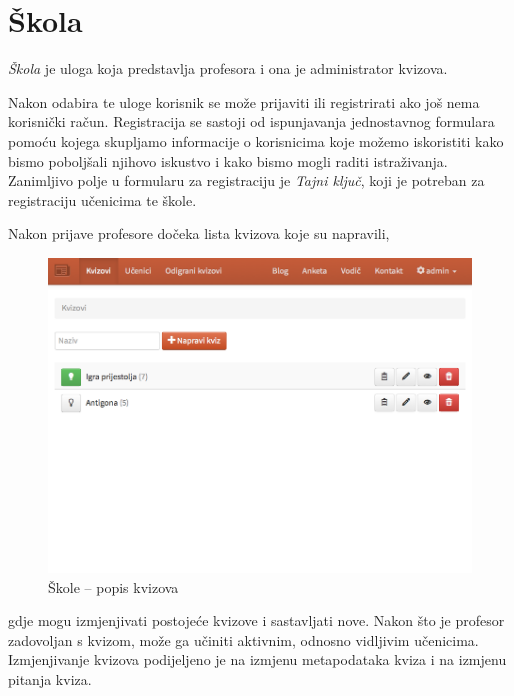 \documentclass{scrreprt}
\begin{document}
\section{Škola}

\emph{Škola} je uloga koja predstavlja profesora i ona je administrator kvizova.

Nakon odabira te uloge korisnik se može prijaviti ili registrirati ako još nema
korisnički račun. Registracija se sastoji od ispunjavanja jednostavnog formulara
pomoću kojega skupljamo informacije o korisnicima koje možemo iskoristiti kako
bismo poboljšali njihovo iskustvo i kako bismo mogli raditi istraživanja.
Zanimljivo polje u formularu za registraciju je \emph{Tajni ključ}, koji je
potreban za registraciju učenicima te škole.

Nakon prijave profesore dočeka lista kvizova koje su napravili,

\begin{figure}[H]
  \includegraphics[width=\textwidth, clip=true, trim=0 10cm 0 0, fbox]{school/quizzes}
  \caption{Škole -- popis kvizova}
\end{figure}

gdje mogu izmjenjivati postojeće kvizove i sastavljati nove. Nakon što je
profesor zadovoljan s kvizom, može ga učiniti aktivnim, odnosno vidljivim
učenicima. Izmjenjivanje kvizova podijeljeno je na izmjenu metapodataka kviza i
na izmjenu pitanja kviza.
\end{document}
